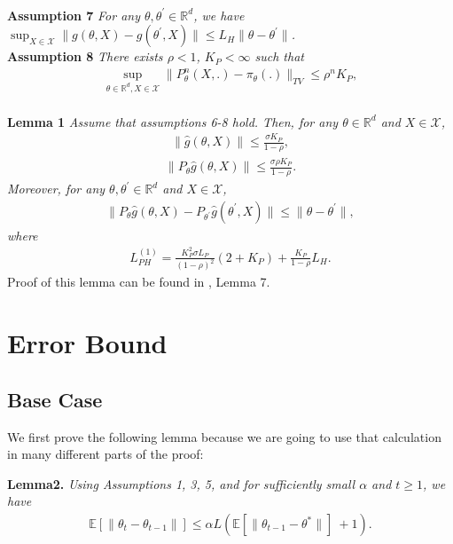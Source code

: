 \documentclass[a4paper]{article}
\newcommand{\norm}[1]{\|#1 \|}
\newcommand{\Exs}{\mathbb{E}}
\newcommand{\thetastar}{\theta^*}
\newcommand{\constLPH}[1]{L_{PH}^{(#1)}}
\newcommand{\stepsize}{\alpha}
\begin{document}
	\\
	\textbf{Assumption 7} \textit{
		For any $\theta, \theta^{\prime} \in \mathbb{R}^{d}$, we have $\sup_{X \in \mathcal{X}}\norm{g\left(\theta, X\right) - g\left(\theta^{\prime}, X\right)} \le L_{H}\norm{\theta - \theta^{\prime}}$.
	}
	\\
	\textbf{Assumption 8} \textit{
		There exists $\rho < 1$, $K_{P} < \infty$ such that
		\begin{align*}
			\sup_{\theta \in \mathbb{R}^{d}, X \in \mathcal{X}} \norm{P_{\theta}^{n}\left(X, .\right) - \pi_{\theta}(.)}_{TV} \le \rho^{n}K_{P},
		\end{align*}
	}
	\\
	\textbf{Lemma 1} \textit{
		Assume that assumptions 6-8 hold. Then, for any $\theta \in \mathbb{R}^{d}$ and $X \in \mathcal{X}$,
		\begin{align*}
			\norm{\hat{g}\left(\theta, X\right)} \le \frac{\sigma K_{P}}{1 - \rho},
		\end{align*}
		\begin{align*}
			\norm{P_{\theta}\hat{g}\left(\theta, X\right)} \le \frac{\sigma \rho K_{P}}{1 - \rho}.
		\end{align*}
		Moreover, for any $\theta, \theta^{\prime} \in \mathbb{R}^{d}$ and $X \in \mathcal{X}$,
		\begin{align*}
			\norm{P_{\theta}\hat{g}\left(\theta, X\right) - P_{\theta^{\prime}}\hat{g}\left(\theta^{\prime}, X\right)} \le \norm{\theta - \theta^{\prime}},
		\end{align*}
		where
		\begin{align*}
			\constLPH{1} = \frac{K_{P}^{2}\sigma L_{P}}{(1 - \rho)^{2}}\left(2 + K_{P}\right) + \frac{K_{P}}{1 - \rho}L_{H}.
		\end{align*}
	}
	Proof of this lemma can be found in \cite{karimi2019non}, Lemma 7.
	\section{Error Bound}
	
	
	\subsection{Base Case}
	
	We first prove the following lemma because we are going to use that calculation in many different parts of the proof:
	
	\textbf{Lemma2.} \textit{Using Assumptions 1, 3, 5, and for sufficiently small $\stepsize$ and $t \ge 1$, we have
	\begin{align*}
		\Exs\left[\norm{\theta_{t} - \theta_{t - 1}}\right] \leq \stepsize L\left(\Exs\left[\norm{\theta_{t - 1} - \thetastar}\right]\ + 1\right).
	\end{align*}
	}
	
\end{document}
